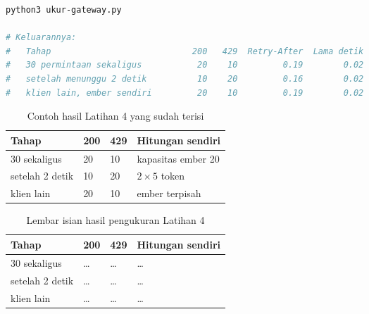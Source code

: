\begin{lstlisting}[language=bash, caption={Mengukur batas laju gateway, tersedia di \berkas{sources/chapter12/ukur-gateway.py}}, label={lst:c12-lat4-jalan}]
python3 ukur-gateway.py

# Keluarannya:
#   Tahap                            200   429  Retry-After  Lama detik
#   30 permintaan sekaligus           20    10         0.19        0.02
#   setelah menunggu 2 detik          10    20         0.16        0.02
#   klien lain, ember sendiri         20    10         0.19        0.02
\end{lstlisting}

\begin{table}[!htb]
  \centering
  \caption{Contoh hasil Latihan 4 yang sudah terisi}
  \label{tab:c12-lat4-contoh}
  \begin{tabularx}{\textwidth}{Xlll}
    \hline
    \textbf{Tahap} & \textbf{200} & \textbf{429} & \textbf{Hitungan sendiri} \\
    \hline
    30 sekaligus & 20 & 10 & kapasitas ember 20 \\
    \hline
    setelah 2 detik & 10 & 20 & $2 \times 5$ token \\
    \hline
    klien lain & 20 & 10 & ember terpisah \\
    \hline
  \end{tabularx}
\end{table}

\begin{table}[!htb]
  \centering
  \caption{Lembar isian hasil pengukuran Latihan 4}
  \label{tab:c12-lat4-hasil}
  \begin{tabularx}{\textwidth}{Xlll}
    \hline
    \textbf{Tahap} & \textbf{200} & \textbf{429} & \textbf{Hitungan sendiri} \\
    \hline
    30 sekaligus & \dots & \dots & \dots \\
    \hline
    setelah 2 detik & \dots & \dots & \dots \\
    \hline
    klien lain & \dots & \dots & \dots \\
    \hline
  \end{tabularx}
\end{table}
